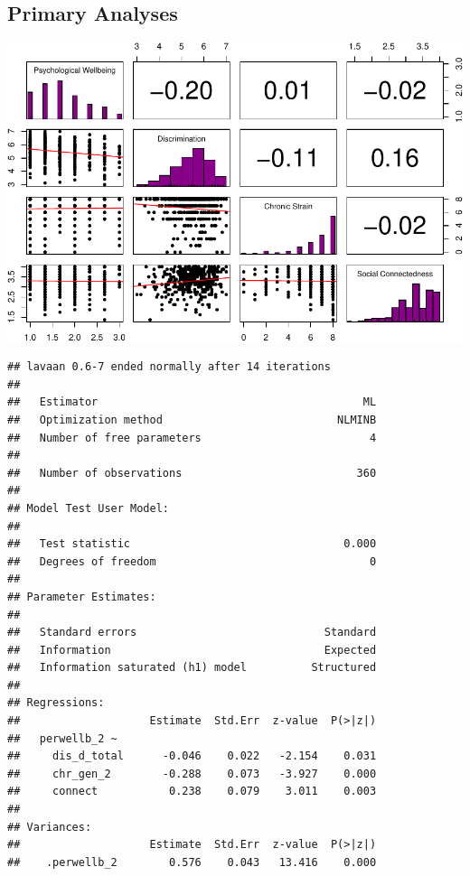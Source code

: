 \documentclass[
  english,
  man,floatsintext]{apa6}
\begin{document}
\hypertarget{primary-analyses}{%
\subsection{Primary Analyses}\label{primary-analyses}}

\includegraphics{prep_script_files/figure-latex/correlation panels-1.pdf}

\begin{verbatim}
## lavaan 0.6-7 ended normally after 14 iterations
## 
##   Estimator                                         ML
##   Optimization method                           NLMINB
##   Number of free parameters                          4
##                                                       
##   Number of observations                           360
##                                                       
## Model Test User Model:
##                                                       
##   Test statistic                                 0.000
##   Degrees of freedom                                 0
## 
## Parameter Estimates:
## 
##   Standard errors                             Standard
##   Information                                 Expected
##   Information saturated (h1) model          Structured
## 
## Regressions:
##                    Estimate  Std.Err  z-value  P(>|z|)
##   perwellb_2 ~                                        
##     dis_d_total      -0.046    0.022   -2.154    0.031
##     chr_gen_2        -0.288    0.073   -3.927    0.000
##     connect           0.238    0.079    3.011    0.003
## 
## Variances:
##                    Estimate  Std.Err  z-value  P(>|z|)
##    .perwellb_2        0.576    0.043   13.416    0.000
\end{verbatim}
\end{document}
